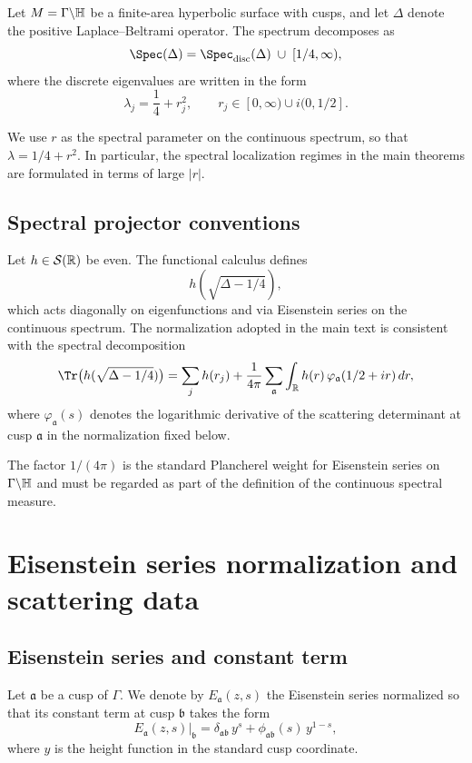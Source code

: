Let $M=\Gamma\backslash\mathbb{H}$ be a finite-area hyperbolic surface with cusps, and let $\Delta$ denote the positive
Laplace--Beltrami operator.  The spectrum decomposes as
\[
\Spec(\Delta)
=
\Spec_{\mathrm{disc}}(\Delta)\;\cup\;[1/4,\infty),
\]
where the discrete eigenvalues are written in the form
\begin{equation}\label{eq:G.eigs}
\lambda_j=\frac14+r_j^2,
\qquad
r_j\in[0,\infty)\cup i(0,1/2].
\end{equation}

We use $r$ as the spectral parameter on the continuous spectrum, so that $\lambda=1/4+r^2$.
In particular, the spectral localization regimes in the main theorems are formulated in terms of large $|r|$.

\subsection{Spectral projector conventions}
\label{subsec:G.projector}

Let $h\in \mathcal{S}(\mathbb{R})$ be even.  The functional calculus defines
\[
h(\sqrt{\Delta-1/4}),
\]
which acts diagonally on eigenfunctions and via Eisenstein series on the continuous spectrum.
The normalization adopted in the main text is consistent with the spectral decomposition
\begin{equation}\label{eq:G.spectral.decomp}
\Tr\big(h(\sqrt{\Delta-1/4})\big)
=
\sum_{j} h(r_j)
+
\frac{1}{4\pi}\sum_{\mathfrak{a}}
\int_{\R} h(r)\,\varphi_{\mathfrak{a}}(1/2+ir)\,dr,
\end{equation}
where $\varphi_{\mathfrak{a}}(s)$ denotes the logarithmic derivative of the scattering determinant at cusp
$\mathfrak{a}$ in the normalization fixed below.

The factor $1/(4\pi)$ is the standard Plancherel weight for Eisenstein series on $\Gamma\backslash\mathbb{H}$ and must be
regarded as part of the definition of the continuous spectral measure.

\section{Eisenstein series normalization and scattering data}
\label{sec:G.scattering}

\subsection{Eisenstein series and constant term}
\label{subsec:G.eisenstein}

Let $\mathfrak{a}$ be a cusp of $\Gamma$.  We denote by $E_{\mathfrak{a}}(z,s)$ the Eisenstein series normalized so that
its constant term at cusp $\mathfrak{b}$ takes the form
\begin{equation}\label{eq:G.constant.term}
E_{\mathfrak{a}}(z,s)\big|_{\mathfrak{b}}
=
\delta_{\mathfrak{a}\mathfrak{b}}\,y^s
+
\phi_{\mathfrak{a}\mathfrak{b}}(s)\,y^{1-s},
\end{equation}
where $y$ is the height function in the standard cusp coordinate.

